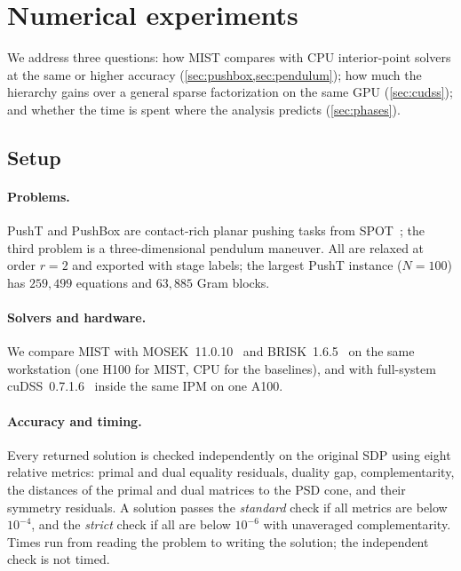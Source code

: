 \section{Numerical experiments}\label{sec:experiments}

We address three questions: how MIST compares with CPU interior-point solvers at
the same or higher accuracy (\cref{sec:pushbox,sec:pendulum}); how much the
hierarchy gains over a general sparse factorization on the same GPU
(\cref{sec:cudss}); and whether the time is spent where the analysis predicts
(\cref{sec:phases}).

\subsection{Setup}\label{sec:setup}

\paragraph{Problems.}
PushT and PushBox are contact-rich planar pushing tasks from SPOT~\cite{kang2025spot};
the third problem is a three-dimensional pendulum maneuver. All are relaxed at
order $r=2$ and exported with stage labels; the largest PushT instance ($N=100$)
has $259{,}499$ equations and $63{,}885$ Gram blocks. 

\paragraph{Solvers and hardware.}
We compare MIST with MOSEK~11.0.10~\cite{mosek} and BRISK~1.6.5~\cite{brisk} on
the same workstation (one H100 for MIST, CPU for the baselines), and with
full-system cuDSS~0.7.1.6~\cite{cudss} inside the same IPM on one A100.

\paragraph{Accuracy and timing.}
Every returned solution is checked independently on the original SDP using eight
relative metrics: primal and dual equality residuals, duality gap,
complementarity, the distances of the primal and dual matrices to the PSD cone,
and their symmetry residuals. A solution passes the \emph{standard} check if all
metrics are below $10^{-4}$, and the \emph{strict} check if all are below
$10^{-6}$ with unaveraged complementarity. Times run from reading the problem to
writing the solution; the independent check is not timed.

